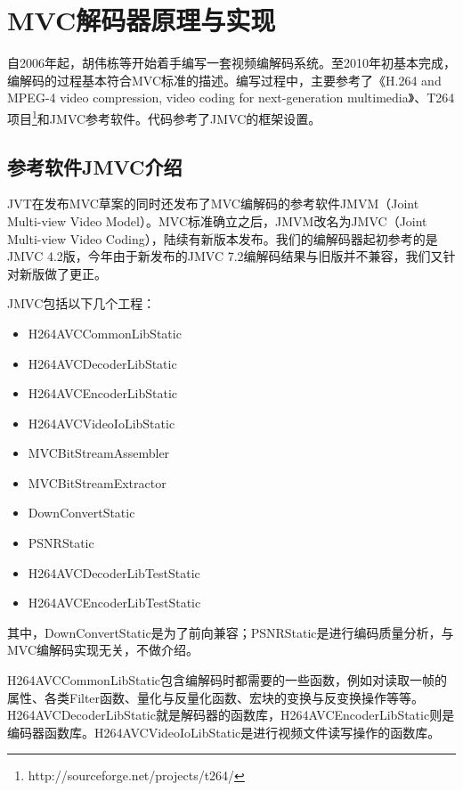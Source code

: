 

\chapter{MVC解码器原理与实现}
\label{cha:decoderprincipleandrealization}

自2006年起，胡伟栋等开始着手编写一套视频编解码系统。至2010年初基本完成，编解码的过程基本符合MVC标准\cite{iso2009mvc}的描述。编写过程中，主要参考了《H.264 and MPEG-4 video compression, video coding for next-generation multimedia》\cite{richardson2003h}、T264项目\footnote{http://sourceforge.net/projects/t264/}和JMVC参考软件。代码参考了JMVC的框架设置。

\section{参考软件JMVC介绍}
\label{sec:introtojmvc}
JVT在发布MVC草案的同时还发布了MVC编解码的参考软件JMVM（Joint Multi-view Video Model）。MVC标准确立之后，JMVM改名为JMVC（Joint Multi-view Video Coding），陆续有新版本发布。我们的编解码器起初参考的是JMVC 4.2版，今年由于新发布的JMVC 7.2编解码结果与旧版并不兼容，我们又针对新版做了更正。

JMVC包括以下几个工程：
\begin{itemize}
\item H264AVCCommonLibStatic
\item H264AVCDecoderLibStatic
\item H264AVCEncoderLibStatic
\item H264AVCVideoIoLibStatic
\item MVCBitStreamAssembler
\item MVCBitStreamExtractor
\item DownConvertStatic
\item PSNRStatic
\item H264AVCDecoderLibTestStatic
\item H264AVCEncoderLibTestStatic
\end{itemize}

其中，DownConvertStatic是为了前向兼容；PSNRStatic是进行编码质量分析，与MVC编解码实现无关，不做介绍。

H264AVCCommonLibStatic包含编解码时都需要的一些函数，例如对读取一帧的属性、各类Filter函数、量化与反量化函数、宏块的变换与反变换操作等等。H264AVCDecoderLibStatic就是解码器的函数库，H264AVCEncoderLibStatic则是编码器函数库。H264AVCVideoIoLibStatic是进行视频文件读写操作的函数库。

